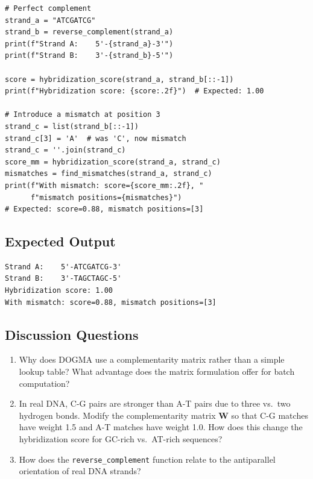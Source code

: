 \begin{lstlisting}[style=dogmapython, caption={Lab 1: Testing hybridization.}]
# Perfect complement
strand_a = "ATCGATCG"
strand_b = reverse_complement(strand_a)
print(f"Strand A:    5'-{strand_a}-3'")
print(f"Strand B:    3'-{strand_b}-5'")

score = hybridization_score(strand_a, strand_b[::-1])
print(f"Hybridization score: {score:.2f}")  # Expected: 1.00

# Introduce a mismatch at position 3
strand_c = list(strand_b[::-1])
strand_c[3] = 'A'  # was 'C', now mismatch
strand_c = ''.join(strand_c)
score_mm = hybridization_score(strand_a, strand_c)
mismatches = find_mismatches(strand_a, strand_c)
print(f"With mismatch: score={score_mm:.2f}, "
      f"mismatch positions={mismatches}")
# Expected: score=0.88, mismatch positions=[3]
\end{lstlisting}

\subsection{Expected Output}

\begin{lstlisting}[style=dogmapython, caption={Lab 1: Expected output.}, numbers=none]
Strand A:    5'-ATCGATCG-3'
Strand B:    3'-TAGCTAGC-5'
Hybridization score: 1.00
With mismatch: score=0.88, mismatch positions=[3]
\end{lstlisting}

\subsection{Discussion Questions}

\begin{enumerate}[leftmargin=1.8em]
  \item Why does DOGMA use a complementarity matrix rather than a simple lookup table? What advantage does the matrix formulation offer for batch computation?
  \item In real DNA, C-G pairs are stronger than A-T pairs due to three vs.\ two hydrogen bonds. Modify the complementarity matrix $\mathbf{W}$ so that C-G matches have weight 1.5 and A-T matches have weight 1.0. How does this change the hybridization score for GC-rich vs.\ AT-rich sequences?
  \item How does the \texttt{reverse\_complement} function relate to the antiparallel orientation of real DNA strands?
\end{enumerate}

